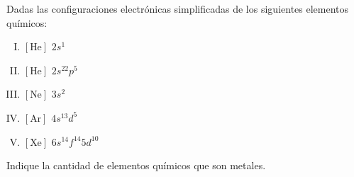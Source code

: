 Dadas las configuraciones electrónicas simplificadas de los siguientes elementos químicos:\\
\begin{enumerate}[I.]
	\item $[\text{He}]$ $2s^1$
	\item $[\text{He}]$ $2s^22p^5$
	\item $[\text{Ne}]$ $3s^2$
	\item $[\text{Ar}]$ $4s^13d^5$
	\item $[\text{Xe}]$ $6s^14f^{14}5d^{10}$
\end{enumerate}
Indique la cantidad de elementos químicos que son metales.
